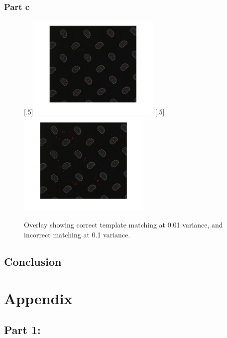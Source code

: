 \documentclass[a4paper]{article}
\begin{document}
	\subsubsection{Part c}
	\begin{figure}[H]
		\centering
		[.5\linewidth]{\includegraphics[height=5cm]{Results/Q3/c/qcOverlay001.jpg}}%
		[.5\linewidth]{\includegraphics[height=5cm]{Results/Q3/c/qcOverlay01.jpg}}%
		\caption{Overlay showing correct template matching at 0.01
		variance, and incorrect matching at 0.1 variance.}
		\label{fig:}
	\end{figure}
	\subsection{Conclusion}
	\section{Appendix}
	\subsection{Part 1:}
\end{document}
